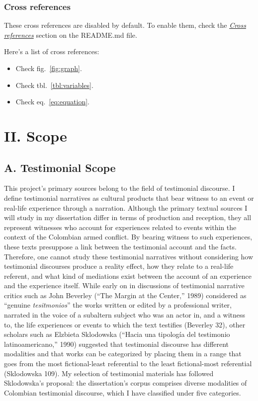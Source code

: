 \documentclass[
  11pt,
,
onecolumn,
openany
]{book}
\providecommand{\tightlist}{%
  \setlength{\itemsep}{0pt}\setlength{\parskip}{0pt}}
\begin{document}
\hypertarget{cross-references}{%
\subsection{Cross references}\label{cross-references}}

These cross references are disabled by default. To enable them, check the
\emph{\href{https://github.com/wikiti/pandoc-book-template\#cross-references}{Cross
references}} section on the README.md file.

Here's a list of cross references:

\begin{itemize}
\tightlist
\item
  Check fig.~\ref{fig:graph}.
\item
  Check tbl.~\ref{tbl:variables}.
\item
  Check eq.~\ref{eq:equation}.
\end{itemize}

\hypertarget{ii.-scope}{%
\chapter{II. Scope}\label{ii.-scope}}

\hypertarget{a.-testimonial-scope}{%
\section{A. Testimonial Scope}\label{a.-testimonial-scope}}

This project's primary sources belong to the field of testimonial discourse. I
define testimonial narratives as cultural products that bear witness to an
event or real-life experience through a narration. Although the primary
textual sources I will study in my dissertation differ in terms of production
and reception, they all represent witnesses who account for experiences
related to events within the context of the Colombian armed conflict. By
bearing witness to such experiences, these texts presuppose a link between the
testimonial account and the facts. Therefore, one cannot study these
testimonial narratives without considering how testimonial discourses produce
a reality effect, how they relate to a real-life referent, and what kind of
mediations exist between the account of an experience and the experience
itself. While early on in discussions of testimonial narrative critics such as
John Beverley (``The Margin at the Center,'' 1989) considered as ``genuine
\emph{tesitmonios}'' the works written or edited by a professional writer,
narrated in the voice of a subaltern subject who was an actor in, and a
witness to, the life experiences or events to which the text testifies
(Beverley 32), other scholars such as Elzbieta Sklodowska (``Hacia una
tipología del testimonio latinoamericano,'' 1990) suggested that testimonial
discourse has different modalities and that works can be categorized by
placing them in a range that goes from the most fictional-least referential to
the least fictional-most referential (Sklodowska 109). My selection of
testimonial materials has followed Sklodowska's proposal: the dissertation's
corpus comprises diverse modalities of Colombian testimonial discourse, which
I have classified under five categories.
\end{document}
